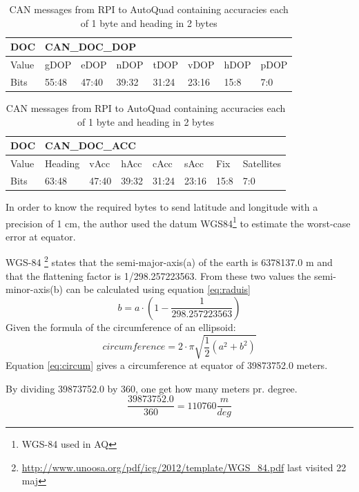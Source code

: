 \begin{table}[H]
	\begin{tabular}{@{}|l|l|l|l|l|l|l|l|@{}}
		\toprule
		DOC   & \multicolumn{7}{l|}{CAN\_DOC\_DOP}                  \\ \midrule
		Value & gDOP  & eDOP  & nDOP  & tDOP  & vDOP  & hDOP & pDOP \\ \midrule
		Bits  & 55:48 & 47:40 & 39:32 & 31:24 & 23:16 & 15:8 & 7:0  \\ \bottomrule
	\end{tabular}
	\caption{CAN messages from RPI to AutoQuad containing DOPs each of 1 byte}
	\label{tab:CAN_DOC_DOP}
	\begin{tabular}{@{}|l|l|l|l|l|l|l|l|@{}}
		\toprule
		DOC   & \multicolumn{7}{l|}{CAN\_DOC\_ACC}                          \\ \midrule
		Value & Heading & vAcc  & hAcc  & cAcc  & sAcc  & Fix  & Satellites \\ \midrule
		Bits  & 63:48   & 47:40 & 39:32 & 31:24 & 23:16 & 15:8 & 7:0        \\ \bottomrule
	\end{tabular}\label{tab:CAN_DOC_ACC}
	\caption{CAN messages from RPI to AutoQuad containing accuracies each of 1 byte and heading in 2 bytes} 
\end{table}

In order to know the required bytes to send latitude and longitude with a precision of 1 cm, the author used the datum WGS84\footnote{WGS-84 used in AQ} to estimate the worst-case error at equator. 

WGS-84 \footnote{\url{http://www.unoosa.org/pdf/icg/2012/template/WGS_84.pdf} last visited 22 maj} states that the semi-major-axis(a) of the earth is 6378137.0 m and that the flattening factor is 1/298.257223563. From these two values the semi-minor-axis(b) can be calculated using equation \ref{eq:raduis}
\begin{equation}
b=a \cdot (1-\frac{1}{298.257223563})
\end{equation} \label{eq:raduis}
Given the formula of the circumference of an ellipsoid:
\begin{equation}
circumference = 2 \cdot \pi \sqrt{ \frac{1}{2}(a^2+b^2)}
\end{equation} \label{eq:circum}
Equation \ref{eq:circum} gives a circumference at equator of 39873752.0 meters.

By dividing 39873752.0 by 360, one get how many meters pr. degree.
\begin{equation}
\frac{39873752.0}{360} = 110760 \frac{m}{deg}
\end{equation}

